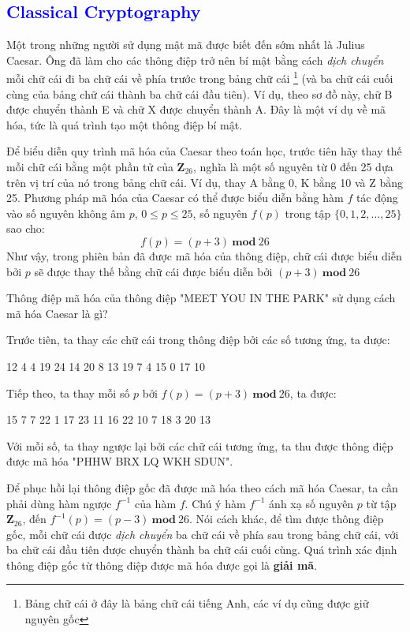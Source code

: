 \textcolor{blue}{\section{Classical Cryptography}}
Một trong những người sử dụng mật mã được biết đến sớm nhất là Julius Caesar.
Ông đã làm cho các thông điệp trở nên bí mật bằng cách \textit{dịch chuyển} mỗi chữ cái đi ba chữ
cái về phía trước trong bảng chữ cái \thanks{Bảng chữ cái ở đây là bảng chữ cái tiếng Anh, các ví dụ cũng được giữ nguyên gốc} (và ba chữ cái cuối cùng của bảng chữ cái
thành ba chữ cái đầu tiên). Ví dụ, theo sơ đồ này, chữ B được chuyển thành E và
chữ X được chuyển thành A. Đây là một ví dụ về mã hóa, tức là quá trình tạo một thông
điệp bí mật.

Để biểu diễn quy trình mã hóa của Caesar theo toán học, trước tiên
hãy thay thế mỗi chữ cái bằng một phần tử của $ \mathbf{Z}_{26} $, nghĩa là một số nguyên từ 0
đến 25 dựa trên vị trí của nó trong bảng chữ cái. Ví dụ, thay A bằng 0,
K bằng 10 và Z bằng 25. Phương pháp mã hóa của Caesar có thể được biểu diễn bằng
hàm $f$ tác động vào số nguyên không âm $p$, $0 \leq p \leq  25$, số nguyên $f(p)$ trong tập
$\{0, 1, 2, \ldots, 25\}$ sao cho:
$$f(p) = (p+3)\ \mathbf{mod}\ 26$$
Như vậy, trong phiên bản đã được mã hóa của thông điệp, chữ cái được biểu diễn bởi $p$ sẽ được thay thế bằng
chữ cái được biểu diễn bởi $(p+3)\ \mathbf{mod}\ 26$
\begin{example}
    Thông điệp mã hóa của thông điệp "MEET YOU IN THE PARK" sử dụng cách mã hóa Caesar là gì?
\end{example}
\begin{solution}
    Trước tiên, ta thay các chữ cái trong thông điệp bởi các số tương ứng, ta được:
    \begin{center}
        12 4 4 19 \hspace{0.5cm} 24 14 20 \hspace{0.5cm} 8 13 \hspace{0.5cm} 19 7 4 \hspace{0.5cm} 15 0 17 10
    \end{center}
    Tiếp theo, ta thay mỗi số $p$ bởi $f(p) = (p+3)\ \mathbf{mod}\ 26$, ta được:
    \begin{center}
        15 7 7 22 \hspace{0.5cm} 1 17 23 \hspace{0.5cm} 11 16 \hspace{0.5cm} 22 10 7 \hspace{0.5cm} 18 3 20 13
    \end{center}
    Với mỗi số, ta thay ngược lại bởi các chữ cái tương ứng, ta thu được thông điệp được mã hóa "PHHW BRX LQ WKH SDUN".
\end{solution}
Để phục hồi lại thông điệp gốc đã được mã hóa theo cách mã hóa Caesar, ta cần phải dùng hàm ngược $f^{-1}$ của hàm $f$.
Chú ý hàm $f^{-1}$ ánh xạ số nguyên $p$ từ tập $ \mathbf{Z}_{26} $, đến $f^{-1}(p) = (p-3)\ \mathbf{mod}\ 26$.
Nói cách khác, để tìm được thông điệp gốc, mỗi chữ cái được \textit{dịch chuyển} ba chữ
cái về phía sau trong bảng chữ cái, với ba chữ cái đầu tiên được chuyển thành ba chữ cái cuối
cùng. Quá trình xác định thông điệp gốc từ thông điệp được mã
hóa được gọi là \textbf{giải mã}.

